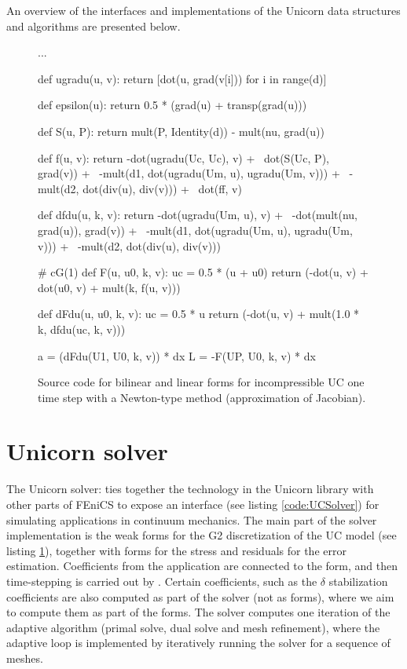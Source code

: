 An overview of the interfaces and implementations of the Unicorn data
structures and algorithms are presented below.

\begin{figure}
\begin{python}

...

def ugradu(u, v):
    return [dot(u, grad(v[i])) for i in range(d)]

def epsilon(u):
    return 0.5 * (grad(u) + transp(grad(u)))

def S(u, P):
    return mult(P, Identity(d)) - mult(nu, grad(u))

def f(u, v):
    return -dot(ugradu(Uc, Uc), v) + \
        dot(S(Uc, P), grad(v)) + \
	-mult(d1, dot(ugradu(Um, u), ugradu(Um, v))) + \
	-mult(d2, dot(div(u), div(v))) + \
        dot(ff, v)

def dfdu(u, k, v):
    return -dot(ugradu(Um, u), v) + \
        -dot(mult(nu, grad(u)), grad(v)) + \
        -mult(d1, dot(ugradu(Um, u), ugradu(Um, v))) + \
        -mult(d2, dot(div(u), div(v)))

# cG(1)
def F(u, u0, k, v):
    uc = 0.5 * (u + u0)
    return (-dot(u, v) + dot(u0, v) + mult(k, f(u, v)))

def dFdu(u, u0, k, v):
    uc = 0.5 * u
    return (-dot(u, v) + mult(1.0 * k, dfdu(uc, k, v)))

a = (dFdu(U1, U0, k, v)) * dx
L = -F(UP, U0, k, v) * dx

\end{python}
\caption{Source code for bilinear and linear forms for incompressible
UC one time step with a Newton-type method (approximation of Jacobian).}
\label{code:FFC_UC}
\end{figure}

\section{Unicorn solver}

The Unicorn solver: \emp{UCSolver} ties together the technology in
the Unicorn library with other parts of FEniCS to expose an interface
(see listing \ref{code:UCSolver}) for simulating applications in
continuum mechanics. The main part of the solver implementation
is the weak forms for the G2 discretization of the UC model (see
listing \ref{code:FFC_UC}), together with forms for the stress and
residuals for the error estimation. Coefficients from the application
are connected to the form, and then time-stepping is carried out by
\emp{TimeDependentPDE}. Certain coefficients, such as the $\delta$
stabilization coefficients are also computed as part of the solver
(not as forms), where we aim to compute them as part of the forms. The
solver computes one iteration of the adaptive algorithm (primal solve,
dual solve and mesh refinement), where the adaptive loop is implemented
by iteratively running the solver for a sequence of meshes.

